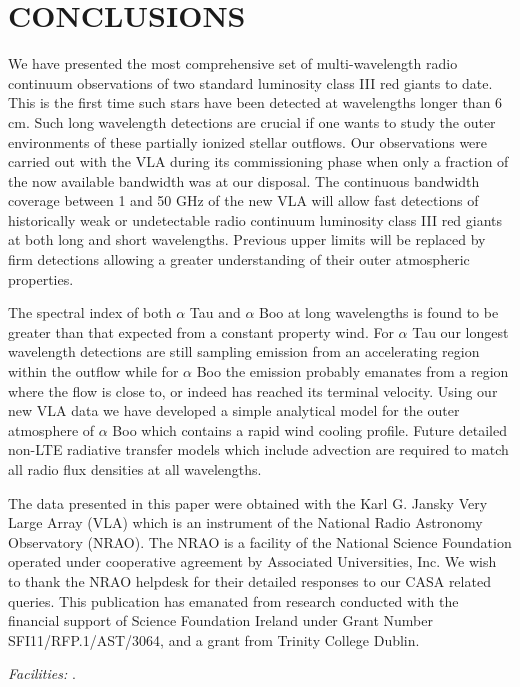 \documentclass[iop]{emulateapj}
\begin{document}
\section{CONCLUSIONS}
We have presented the most comprehensive set of multi-wavelength radio continuum observations of two standard luminosity class III red giants to date. This is the first time such stars have been detected at wavelengths longer than 6 cm. Such long wavelength detections are crucial if one wants to study the outer environments of these partially ionized stellar outflows. Our observations were carried out with the VLA during its commissioning phase when only a fraction of the now available bandwidth was at our disposal. The continuous bandwidth coverage between 1 and 50 GHz of the new VLA will allow fast detections of historically weak or undetectable radio continuum luminosity class III red giants at both long and short wavelengths. Previous upper limits will be replaced by firm detections allowing a greater understanding of their outer atmospheric properties.

The spectral index of both $\alpha$ Tau and $\alpha$ Boo at long wavelengths is found to be greater than that expected from a constant property wind. For $\alpha$ Tau our longest wavelength detections are still sampling emission from an accelerating region within the outflow while for $\alpha$ Boo the emission probably emanates from a region where the flow is close to, or indeed has reached its terminal velocity. Using our new VLA data we have developed a simple analytical model for the outer atmosphere of $\alpha$ Boo which contains a rapid wind cooling profile. Future detailed non-LTE radiative transfer models which include advection are required to match all radio flux densities at all wavelengths. 


\acknowledgments
The data presented in this paper were obtained with the Karl G. Jansky Very Large Array (VLA) which is an instrument of the National Radio Astronomy Observatory (NRAO). The NRAO is a facility of the National Science Foundation operated under cooperative agreement by Associated Universities, Inc. We wish to thank the NRAO helpdesk for their detailed responses to our CASA related queries. This publication has emanated from research conducted with the financial support of Science Foundation Ireland under Grant Number SFI11/RFP.1/AST/3064, and a grant from Trinity College Dublin.

{\it Facilities:} .




\end{document}
